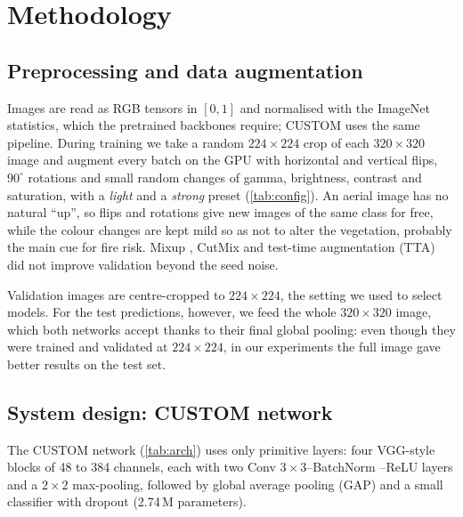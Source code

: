 \section{Methodology}\label{sec:method}

\subsection{Preprocessing and data augmentation}\label{sec:prep}
Images are read as RGB tensors in $[0,1]$ and normalised with the ImageNet statistics, which the pretrained backbones require; CUSTOM uses the same pipeline. During training we take a random $224\times224$ crop of each $320\times320$ image and augment every batch on the GPU with horizontal and vertical flips, $90^\circ$ rotations and small random changes of gamma, brightness, contrast and saturation, with a \emph{light} and a \emph{strong} preset (\cref{tab:config}). An aerial image has no natural ``up'', so flips and rotations give new images of the same class for free, while the colour changes are kept mild so as not to alter the vegetation, probably the main cue for fire risk. Mixup \citep{zhang2018mixup}, CutMix \citep{yun2019cutmix} and test-time augmentation (TTA) did not improve validation beyond the seed noise.

Validation images are centre-cropped to $224\times224$, the setting we used to select models. For the test predictions, however, we feed the whole $320\times320$ image, which both networks accept thanks to their final global pooling: even though they were trained and validated at $224\times224$, in our experiments the full image gave better results on the test set.

\subsection{System design: CUSTOM network}\label{sec:custom}
The CUSTOM network (\cref{tab:arch}) uses only primitive layers: four VGG-style blocks \citep{simonyan2015vgg} of 48 to 384 channels, each with two Conv $3\times3$--BatchNorm \citep{ioffe2015batchnorm}--ReLU layers and a $2\times2$ max-pooling, followed by global average pooling (GAP) \citep{lin2014nin} and a small classifier with dropout (2.74\,M parameters).

